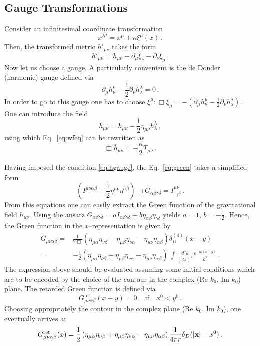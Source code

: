 \documentclass[12pt]{article}
\newcommand{\be}{\begin{equation}}
\newcommand{\ee}{\end{equation}}
\newcommand\m{\mu}
\newcommand\n{\nu}
\renewcommand\a{\alpha}
\renewcommand\b{\beta}
\renewcommand\l{\lambda}
\def\d{\partial}
\begin{document}
\subsection{Gauge Transformations}
\label{sec:gauge}

Consider an infinitesimal coordinate transformation
\be
x'^\m=x^\m+\kappa \xi^\m(x)\,.
\ee
Then, the transformed metric $h'_{\m\n}$ takes the form
\be
h'_{\m\n}=h_{\m \n}-\d_\m\xi_\n-\d_\n \xi_\m\,.
\ee
Now let us choose a gauge. A particularly convenient is the de Donder (harmonic) gauge defined via
\be
\label{eq:dedon}
\d_\m h^\m_\n-\frac{1}{2}\d_\n h^\l_\l=0\,.
\ee
In order to go to this gauge one has to choose $\xi^\m:\Box \xi_\m=-(\d_\m h^\m_\n-\frac{1}{2}\d_\n h^\l_\l)$.
One can introduce the field
\be
\label{eq:hgauge}
\bar h_{\m \n}= h_{\m \n}-\frac{1}{2}\eta_{\m \n}h^\l_\l\,,
\ee
using which Eq.~\eqref{eq:wfeq} can be rewritten as
\be
\Box\bar h_{\m\n} =-\frac{\kappa}{2}T_{\m\n}\,.
\ee

Having imposed the condition
\eqref{eq:hgauge}, the Eq.~\eqref{eq:green} takes a simplified form
\begin{equation}
 \left(I^{\mu\nu\alpha\beta}-\dfrac{1}{2}\eta^{\mu\nu}\eta^{\alpha\beta}\right)\Box  G_{\alpha\beta\gamma\delta}=I^{\mu\nu}_{~~\gamma\delta}\,.
\end{equation}
From this equations
one can easily extract the Green function of the gravitational field $h_{\mu\nu}$.
Using the ansatz $G_{\alpha\beta\gamma\delta}=aI_{\alpha\beta\gamma\delta}+b\eta_{\alpha\beta}\eta_{\gamma\delta}$ yields $a=1$, $b=-\frac{1}{2}$. Hence, the Green function in the $x$--representation is given by
\be
\label{eq:greenfinal}
\begin{split}
G_{\m\n\a\b}=&\frac{1}{2\Box}\left(\eta_{\m\a}\eta_{\n\b}+\eta_{\m\b}\eta_{\n\a}-\eta_{\m\n}\eta_{\a\b}\right)\delta^{(4)}_{D}(x-y)\\
=&-\frac{1}{2}\left(\eta_{\m\a}\eta_{\n\b}+\eta_{\m\b}\eta_{\n\a}-\eta_{\m\n}\eta_{\a\b}\right)\
\int \frac{d^4 k}{(2\pi)^4}\frac{e^{-ik(x-y)}}{k^2}\,.
\end{split}
\ee
The expression above should be evaluated assuming some initial conditions which are to be encoded by
the choice of the contour in the complex (Re $k_0$, Im $k_0$) plane.
The retarded Green function is defined via
\be
 G^{\text{ret}}_{\m\n\a\b}(x-y)=0\,\quad \text{if}\quad x^0<y^0\,.
\ee
Choosing appropriately the contour in the complex plane (Re $k_0$, Im $k_0$), one eventually arrives at
\be
 G^{\text{ret}}_{\m\n\a\b}(x)=\frac{1}{2}\left(\eta_{\m\a}\eta_{\n\b}+\eta_{\m\b}\eta_{\n\a}-\eta_{\m\n}\eta_{\a\b}\right)
 \frac{1}{4\pi r}\delta_D(|{\bf x}|-x^0)\,.
\ee
\end{document}
